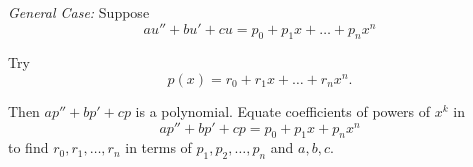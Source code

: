 \emph{General Case:} Suppose
\[
 au'' + bu' + cu = p_0 + p_1x + \ldots + p_{n}x^{n}
\]

Try
\[
 p(x) = r_0 + r_1 x + \ldots + r_{n} x^{n}.
\]

Then $ap'' + bp' + cp$ is a polynomial. Equate coefficients of powers of $x^{k}$ in
\[
 ap'' + bp' + cp = p_0 + p_1 x + p_{n}x^{n}
\]
to find $r_0,r_1, \ldots, r_{n}$ in terms of $p_1, p_2, \ldots, p_n$ and $a,b,c$.

